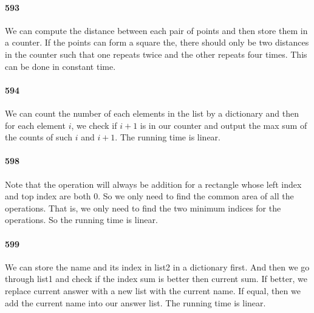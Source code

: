 \documentclass[11pt]{article}
\begin{document}
\begin{itemize}
\paragraph{593}
We can compute the distance between each pair of points and then store them in a counter. If the points can form a square 
the, there should only be two distances in the counter such that one repeats twice and the other repeats four times.
This can be done in constant time.


\paragraph{594}
We can count the number of each elements in the list by a dictionary and then for each element $i$, we check if $i+1$ is in 
our counter and output the max sum of the counts of such $i$ and $i+1$. The running time is linear.

\paragraph{598}
Note that the operation will always be addition for a rectangle whose left index and top index are both 0. So we only need to 
find the common area of all the operations. That is, we only need to find the two minimum indices for the operations. So the 
running time is linear. 


\paragraph{599}
We can store the name and its index in list2 in a dictionary first. And then we go through list1 and check if the index sum is
better then current sum. If better, we replace current answer with a new list with the current name. If equal, then we add the 
current name into our answer list. The running time is linear.


\end{itemize}
\end{document}
